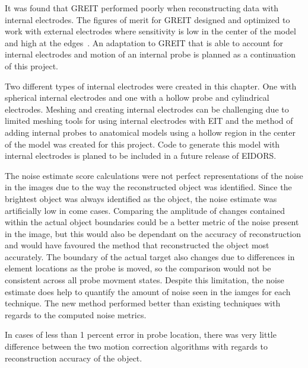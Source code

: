 It was found that GREIT performed poorly when reconstructing data with internal electrodes.
The figures of merit for GREIT designed and optimized to work with external electrodes 
where sensitivity is low in the center of the model and high at the 
edges~\parencite{adler_greit_2009}. An adaptation to GREIT that is able to 
account for internal electrodes and motion of an internal probe is planned as a
continuation of this project.  

Two different types of internal electrodes were created in this chapter. One with
spherical internal electrodes and one with a hollow probe and cylindrical electrodes. 
Meshing and creating internal electrodes can be challenging due to limited meshing tools 
for using internal electrodes with EIT and the method of adding internal probes to
anatomical models using a hollow region in the center of the model was created for this 
project. Code to generate this model with internal electrodes is planed to be included in a
future release of EIDORS.

The noise estimate score calculations were not perfect representations of the noise
in the images due to the way the reconstructed object was identified.  Since the
brightest object was always identified as the object, the noise estimate was
artificially low in come cases. 
Comparing the amplitude of changes contained within the actual
object boundaries could be a better metric of the noise present in the image, but this
would also be dependant on the accuracy of reconstruction and would have favoured
the method that reconstructed the object most accurately.
The boundary of the actual target
also changes due to differences in element locations as the 
probe is moved, so the comparison would not be consistent across all probe movment
states. Despite this limitation, the noise estimate does help to quantify 
the amount of noise seen in the iamges for each technique. 
The new
method performed better than existing techniques with regards to the computed
noise metrics.

In cases of less than 1 percent error in probe location, there was very little 
difference between 
the two motion correction algorithms with regards to 
reconstruction accuracy of the object. 